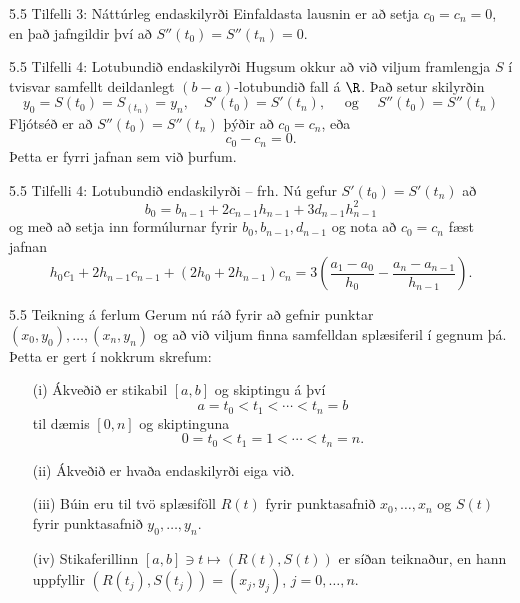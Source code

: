 \begin{frame}{5.5 Tilfelli 3:  Náttúrleg endaskilyrði} 
Einfaldasta lausnin er að setja $c_0 = c_n = 0$, en það 
jafngildir því að $S''(t_0) = S''(t_n) = 0$.
\end{frame}

\begin{frame}{5.5 Tilfelli 4:  Lotubundið endaskilyrði} 
Hugsum okkur að við viljum framlengja $S$ í tvisvar samfellt
deildanlegt $(b-a)$-lotubundið fall á $\R$. Það setur skilyrðin 
\begin{equation*}
	y_0 = S(t_0) = S_(t_n) = y_n, \quad
	S'(t_0) = S'(t_n), \quad
	\text{ og } \quad
	S''(t_0) = S''(t_n)
\end{equation*}
Fljótséð er að $S''(t_0) = S''(t_n)$ þýðir að $c_0 = c_n$, eða
\begin{equation*}
	c_0 - c_n = 0.
\end{equation*}
Þetta er fyrri jafnan sem við þurfum.
\end{frame}

\begin{frame}{5.5 Tilfelli 4: Lotubundið endaskilyrði -- frh.} 
Nú gefur $S'(t_0) = S'(t_n)$ að
\begin{equation*}
	b_0 = b_{n-1} + 2c_{n-1}h_{n-1} + 3d_{n-1}h_{n-1}^2
\end{equation*}
og með að setja inn formúlurnar fyrir $b_0, b_{n-1}, d_{n-1}$ og nota
að $c_0 = c_n$ fæst jafnan 
\begin{equation*}
	h_0c_1 + 2h_{n-1}c_{n-1} + (2h_0 + 2h_{n-1})c_n
	= 3 \left( \frac{a_1-a_0}{h_0} 
		- \frac{a_n-a_{n-1}}{h_{n-1}} \right).
\end{equation*}
\end{frame}

\begin{frame}{5.5 Teikning á ferlum} 
Gerum nú ráð fyrir að gefnir punktar $(x_0,y_0),\dots,(x_n,y_n)$ 
og að við viljum finna samfelldan splæsiferil í gegnum þá. 
Þetta er gert í nokkrum skrefum:

\pause
\begin{enumerate}
\item[(i)] Ákveðið er  stikabil $[a,b]$ og skiptingu á því 
$$
a=t_0<t_1<\cdots<t_n=b
$$
til dæmis $[0,n]$ og skiptinguna
$$
0=t_0<t_1=1<\cdots<t_n=n.
$$
\pause
\item[(ii)] Ákveðið er hvaða endaskilyrði eiga við.
\pause
\item[(iii)] Búin eru til tvö splæsiföll $R(t)$ fyrir punktasafnið 
$x_0,\dots,x_n$ og $S(t)$ fyrir punktasafnið $y_0,\dots,y_n$. 
\pause
\item[(iv)] Stikaferillinn 
$
[a,b]\ni t\mapsto (R(t),S(t)) 
$
er síðan teiknaður, en hann uppfyllir $(R(t_j),S(t_j))=(x_j,y_j)$,
$j=0,\dots,n$. 
\end{enumerate}
\end{frame}

